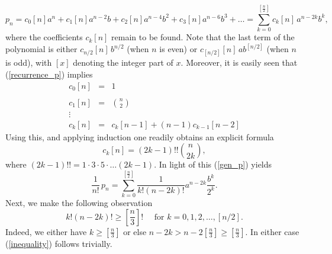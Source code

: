 \documentclass[11 pt]{article}
\begin{document}
 \begin{equation}\label{gen_p}
 p_n = c_0[n]a^n + c_1[n] a^{n-2}b + c_2[n] a^{n-4}b^2 +  c_3[n] a^{n-6}b^3 + \ldots  = \sum\limits_{k=0}^{[\frac{n}{2}]}c_k[n]\, a^{n-2k}b^k,
 \end{equation}
 where the coefficients $c_k[n]$ remain to be found. Note that the last term of the polynomial is either $c_{n/2}[n]\, b^{n/2}$ (when $n$ is even) or $c_{[n/2]}[n]\, a b^{[n/2]}$ (when $n$ is odd), with $[x]$ denoting the integer part of $x$.
Moreover, it is easily seen that (\ref{recurrence_p}) implies 
\begin{equation}\label{recurrence_p}
\begin{array}{lll}
c_0[n] &= &1  \\
&& \\
c_1[n]  &=& {n\choose{2}} \\
\vdots & &\\
c_k[n]& = & c_k[n-1] + (n-1) c_{k-1}[n-2]
\end{array}
\end{equation}
Using this, and applying induction one readily obtains an explicit formula 
\begin{equation}\label{c_formula}
c_k[n] = (2k-1)!!  {n\choose{2k}},
\end{equation}
where $(2k-1)!! = 1\cdot3\cdot 5\cdot \ldots (2k-1)$.
In light of this (\ref{gen_p}) yields
\begin{equation}\label{term_T}
\frac{1}{n!} \, p_n = \sum\limits_{k=0}^{[\frac{n}{2}]}\frac{1}{k!(n-2k)!} a^{n-2k}\frac{b^k}{2^k} .
\end{equation}
  Next, we make the following observation
 \begin{equation}\label{inequality}
 k! (n-2k)! \geq \left[\frac{n}{3}\right]!\quad \mbox{ for } k = 0,1,2,\ldots , [n/2] .
 \end{equation}
 Indeed, we either have $k\geq \left[\frac{n}{3}\right]$ or else $n-2k > n -2 \left[\frac{n}{3}\right] \geq \left[\frac{n}{3}\right] $. In either case (\ref{inequality}) follows trivially. 
 
\end{document}
